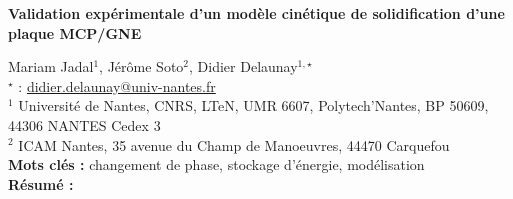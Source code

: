 


    \newpage


%
\begin{flushleft}
\addtocounter{section}{1}
{\Large \textbf{Validation expérimentale d'un modèle cinétique de solidification d'une plaque MCP/GNE}}\label{ref:23}
\end{flushleft}
%
Mariam Jadal$^{1}$, Jérôme Soto$^{2}$, Didier Delaunay$^{1,\star}$\\[2mm]
$^{\star}$ \Letter : \url{didier.delaunay@univ-nantes.fr}\\[2mm]
{\footnotesize $^{1}$ Université de Nantes, CNRS, LTeN, UMR 6607, Polytech'Nantes, BP 50609, 44306 NANTES Cedex 3}\\
{\footnotesize $^{2}$ ICAM Nantes, 35 avenue du Champ de Manoeuvres, 44470 Carquefou}\\
[4mm]
%
\noindent \textbf{Mots clés : } changement de phase, stockage d'énergie, modélisation\\[4mm]
%
\noindent \textbf{Résumé : } 

